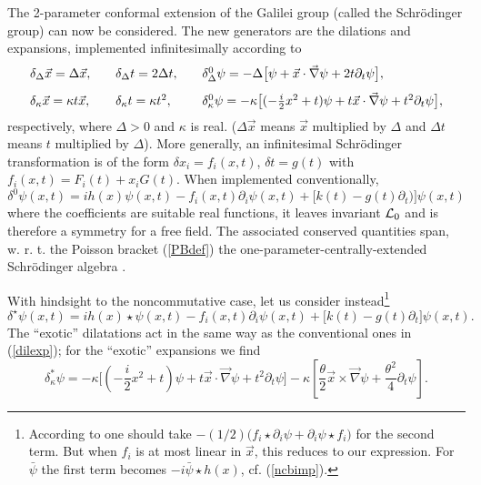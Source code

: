 \documentclass[a4paper,11pt]{article}
\def\p{{\partial}}
\def\vx{{\vec x}}
\def\vnabla{{\vec\nabla}}
\begin{document}
The 2-parameter conformal extension
of the Galilei group  (called the Schr\"odinger group) \cite{JHN}
can now be considered.
The new generators are the dilations and expansions,
implemented infinitesimally according to
\begin{equation}
     \begin{array}{ccc}
    \delta_{\Delta}\vx=\Delta\vx,\quad\hfill
    &\delta_{\Delta}t=2\Delta t,\quad\hfill
    &\delta^0_{\Delta}\psi=
    -\Delta\big[\psi+\vx\cdot\vnabla\psi+2t\p_{t}\psi\big],\hfill
\\[8pt]
\delta_{\kappa}\vx=\kappa t\vx,\,\hfill
&\delta_{\kappa}t=\kappa t^2,\,\hfill
&\delta^0_{\kappa}\psi=-\kappa\big[(-\frac{i}{2}x^2+t)\psi
+t\vx\cdot\vnabla\psi+t^2\p_{t}\psi\big],\hfill
\end{array}
\label{dilexp}
\end{equation}
respectively, where $\Delta>0$ and $\kappa$ is real.
($\Delta\vx$ means $\vx$ multiplied by $\Delta$
and $\Delta t $ means $t$ multiplied by $\Delta$).
More generally, an
infinitesimal Schr\"odinger transformation is of the form
$\delta x_{i}=f_{i}(x,t)$,
$\delta t=g(t)$
with $f_{i}(x,t)=F_{i}(t)+x_{i}G(t)$. When
  implemented conventionally,
\begin{equation}
     \delta^{0}\psi(x,t)=ih(x)\psi(x,t)
     -f_{i}(x,t)\p_{i}\psi(x,t)+\big[k(t)-g(t)\p_{t})\big]\psi(x,t)
     \label{cimplem}
\end{equation}
where the coefficients are suitable real functions,
it leaves invariant ${\cal L}_{0}$ and is therefore a symmetry
for a free field. The associated conserved quantities
span, w. r. t. the Poisson bracket (\ref{PBdef}) the
one-parameter-centrally-extended Schr\"odinger algebra \cite{JHN}.

With hindsight to the noncommutative case, let us
consider instead\footnote{
According to \cite{JP}
  one should take
$-(1/2)\big(f_{i}\star\p_{i}\psi+\p_{i}\psi\star f_{i}\big)$
for the second term. But  when $f_{i}$ is at most linear
in $\vx$, this reduces to our expression.
For $\bar{\psi}$ the first term becomes $-i\bar{\psi}\star h(x)$,
cf. (\ref{ncbimp}).}
  \begin{equation}
     \delta^{\star}\psi(x,t)=ih(x)\star\psi(x,t)
     -f_{i}(x,t)\p_{i}\psi(x,t)+\big[k(t)-g(t)\p_{t}\big]\psi(x,t).
     \label{ncimplem}
\end{equation}
The ``exotic'' dilatations act in the same way
as the conventional ones in (\ref{dilexp});
for the ``exotic'' expansions we find
\begin{equation}
     \delta^*_{\kappa}\psi=-\kappa\big[(-\frac{i}{2}x^2+t)\psi
+t\vx\cdot\vnabla\psi+t^2\p_{t}\psi\big]
-\kappa\left[
\frac{\theta}{2}\vx\times\vnabla\psi+\frac{\theta^2}{4}
\p_{t}\psi\right].
\label{exexp}
\end{equation}
\end{document}
